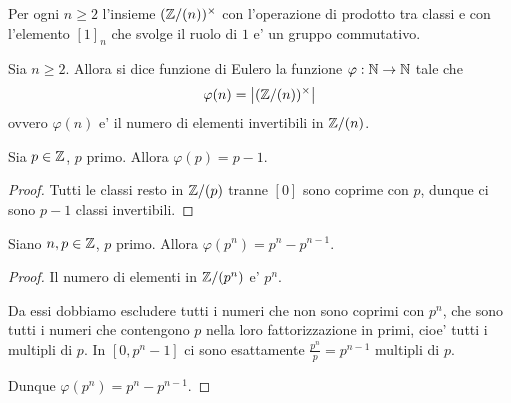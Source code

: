 \begin{proposition}\label{Z(n)*_anello}
    Per ogni $n \geq 2$ l'insieme $(\mathbb{Z}/(n))^{\times}$ con l'operazione di prodotto tra classi e con l'elemento $[1]_n$ che svolge il ruolo di $1$ e' un gruppo commutativo.
\end{proposition}

\begin{definition}
    Sia $n \geq 2$. Allora si dice funzione di Eulero la funzione $\varphi : \mathbb{N} \to \mathbb{N}$ tale che \begin{equation}
        \varphi(n) = \left|(\mathbb{Z}/(n))^{\times}\right|
    \end{equation}
    ovvero $\varphi(n)$ e' il numero di elementi invertibili in $\mathbb{Z}/(n)$.
\end{definition}

\begin{proposition}
    Sia $p \in \mathbb{Z}$, $p$ primo. Allora $\varphi(p) = p - 1$. 
\end{proposition}
\begin{proof}
    Tutti le classi resto in $\mathbb{Z}/(p)$ tranne $[0]$ sono coprime con $p$, dunque ci sono $p-1$ classi invertibili.
\end{proof}

\begin{proposition}
    Siano $n, p \in \mathbb{Z}$, $p$ primo. Allora $\varphi(p^n) = p^n - p^{n-1}$. 
\end{proposition}
\begin{proof}
    Il numero di elementi in $\mathbb{Z}/(p^n)$ e' $p^n$. 
    
    Da essi dobbiamo escludere tutti i numeri che non sono coprimi con $p^n$, che sono tutti i numeri che contengono $p$ nella loro fattorizzazione in primi, cioe' tutti i multipli di $p$.
    In $[0, p^n - 1]$ ci sono esattamente $\frac{p^n}{p} = p^{n-1}$ multipli di $p$.

    Dunque $\varphi(p^n) = p^n - p^{n-1}$.
\end{proof}

